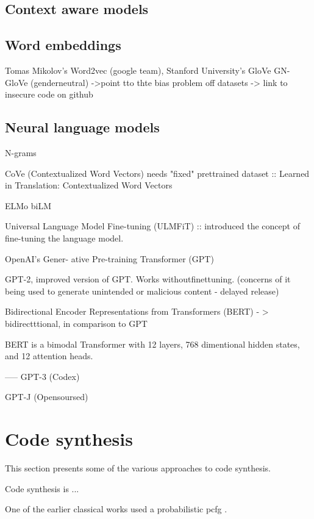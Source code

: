 \subsection{Context aware models}



\subsection{Word embeddings}



Tomas Mikolov's Word2vec (google team),
Stanford University's GloVe
GN-GloVe (genderneutral) ->point tto thte bias problem off datasets -> link to insecure code on  github



\subsection{Neural language models}
N-grams

CoVe (Contextualized Word Vectors) needs "fixed" prettrained dataset :: Learned in Translation: Contextualized Word Vectors

ELMo biLM

Universal Language Model Fine-tuning (ULMFiT) :: introduced the concept of fine-tuning the language model.

OpenAI’s Gener- ative Pre-training Transformer (GPT)

GPT-2, improved version of GPT. Works withoutfinettuning. (concerns of it being used to generate unintended or malicious content - delayed release)

Bidirectional Encoder Representations from Transformers (BERT) - > bidirectttional, in comparison to GPT

BERT is a bimodal Transformer with 12 layers, 768 dimentional hidden states, and 12 attention heads.

-----
GPT-3 (Codex)

GPT-J (Opensoursed)


\section{Code synthesis}
This section presents some of the various approaches to code synthesis. 

Code synthesis is ... 

One of the earlier classical works used a probabilistic \acrfull{pcfg} \cite{allamanis2015bimodal}.

